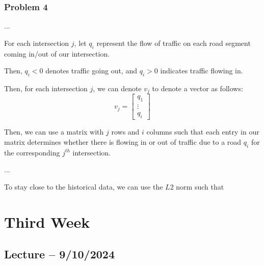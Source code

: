 \documentclass[openany]{book}
\begin{document}
\subsection{Problem 4}
\begin{hw}
	...
\end{hw}
\begin{solution}
	For each intersection $j$, let $q_i$ represent the flow of traffic on each road segment coming in/out of our intersection.
	
	Then, $q_i < 0$ denotes traffic going out, and $q_i > 0$ indicates traffic flowing in.
	
	Then, for each intersection $j$, we can denote $v_j$ to denote a vector as follows:
	\begin{equation*}
		v_j = \begin{bmatrix}
			q_1 \\ \vdots \\ q_i
		\end{bmatrix}
	\end{equation*}

	Then, we can use a matrix with $j$ rows and $i$ columns such that each entry in our matrix determines whether there is flowing in or out of traffic due to a road $q_i$ for the corresponding $j^{th}$ intersection.
\end{solution}

\begin{hw}
	...
\end{hw}
\begin{solution}
	To stay close to the historical data, we can use the $L2$ norm such that
\end{solution}

\chapter{Third Week}
\section{Lecture -- 9/10/2024}
\end{document}
